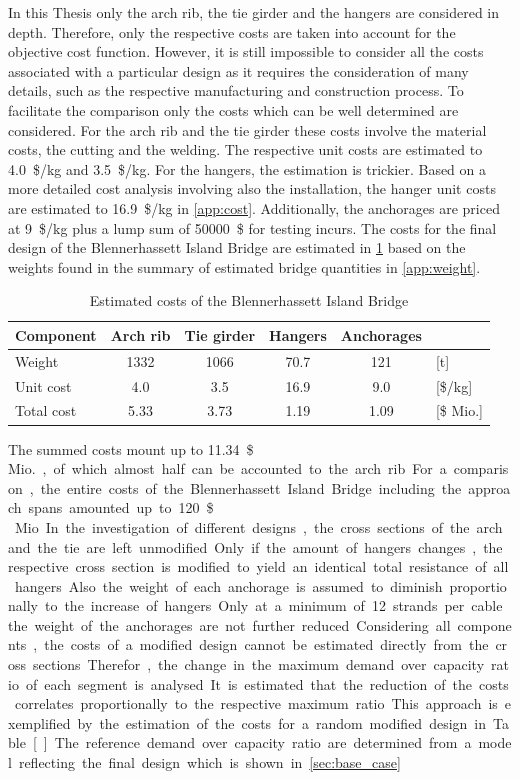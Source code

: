 In this Thesis only the arch rib, the tie girder and the hangers are considered in depth. Therefore, only the respective costs are taken into account for the objective cost function. However, it is still impossible to consider all the costs associated with a particular design as it requires the consideration of many details, such as the respective manufacturing and construction process. To facilitate the comparison only the costs which can be well determined are considered. For the arch rib and the tie girder these costs involve the material costs, the cutting and the welding. The respective unit costs are estimated to \SI{4.0}{\$/kg} and \SI{3.5}{\$/kg}. For the hangers, the estimation is trickier. Based on a more detailed cost analysis involving also the installation, the hanger unit costs are estimated to \SI{16.9}{\$/kg} in \cref{app:cost}. Additionally, the anchorages are priced at \SI{9}{\$/kg} plus a lump sum of \SI{50000}{\$} for testing incurs. The costs for the final design of the Blennerhassett Island Bridge are estimated in \cref{tab:cost_example} based on the weights found in the summary of estimated bridge quantities in \cref{app:weight}.

\begin{table}[H]
    \centering
    \caption{Estimated costs of the Blennerhassett Island Bridge}
    \label{tab:cost_example}
    \begin{tabular}{lccccl}
    \toprule
    Component & Arch rib & Tie girder & Hangers & Anchorages &  \\ \midrule
    Weight & \SI{1332}{} & \SI{1066}{} & \SI{70.7}{} & \SI{121}{} & {[}t{]} \\
    Unit cost & \SI{4.0}{} & \SI{3.5}{} & \SI{16.9}{} & \SI{9.0}{} & {[}\$/kg{]} \\
    Total cost & \SI{5.33}{} & \SI{3.73}{} & \SI{1.19}{} & \SI{1.09}{} & [\$ Mio.] \\ \bottomrule
    \end{tabular}
\end{table}

The summed costs mount up to \SI{11.34}{\$\,Mio.}, of which almost half can be accounted to the arch rib. For a comparison, the entire costs of the Blennerhassett Island Bridge including the approach spans amounted up to \SI{120}{\$\,Mio}. In the investigation of different designs, the cross sections of the arch and the tie are left unmodified. Only if the amount of hangers changes, the respective cross section is modified to yield an identical total resistance of all hangers. Also the weight of each anchorage is assumed to diminish proportionally to the increase of hangers. Only at a minimum of 12 strands per cable the weight of the anchorages are not further reduced. Considering all components, the costs of a modified design cannot be estimated directly from the cross sections. Therefor, the change in the maximum demand over capacity ratio of each segment is analysed. It is estimated that the reduction of the costs correlates proportionally to the respective maximum ratio. This approach is exemplified by the estimation of the costs for a random modified design in Table []. The reference demand over capacity ratio are determined from a model reflecting the final design which is shown in \ref{sec:base_case}